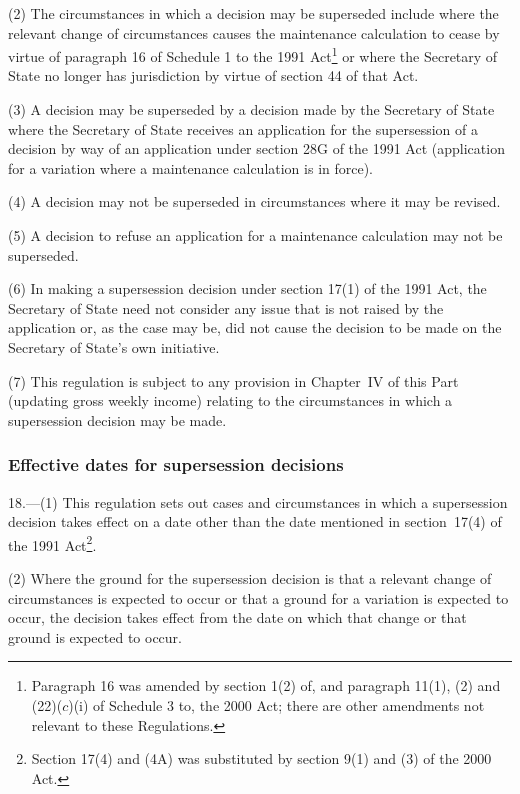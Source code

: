 \documentclass[12pt,a4paper]{article}
\begin{document}
(2) The circumstances in which a decision may be superseded include where the relevant change of circumstances causes the maintenance calculation to cease by virtue of paragraph 16 of Schedule 1 to the 1991 Act\footnote{Paragraph 16 was amended by section 1(2) of, and paragraph 11(1), (2) and (22)($c$)(i)  of Schedule 3 to, the 2000 Act; there are other amendments not relevant to these Regulations.} or where the Secretary of State no longer has jurisdiction by virtue of section 44 of that Act.

(3) A decision may be superseded by a decision made by the Secretary of State where the Secretary of State receives an application for the supersession of a decision by way of an application under section 28G of the 1991 Act (application for a variation where a maintenance calculation is in force).

(4) A decision may not be superseded in circumstances where it may be revised.

(5) A decision to refuse an application for a maintenance calculation may not be superseded.

(6) In making a supersession decision under section 17(1) of the 1991 Act, the Secretary of State need not consider any issue that is not raised by the application or, as the case may be, did not cause the decision to be made on the Secretary of State’s own initiative.

(7) This regulation is subject to any provision in Chapter~IV of this Part (updating gross weekly income) relating to the circumstances in which a supersession decision may be made.

\subsubsection[18. Effective dates for supersession decisions]{Effective dates for supersession decisions}

18.---(1)  This regulation sets out cases and circumstances in which a supersession decision takes effect on a date other than the date mentioned in section~17(4) of the 1991 Act\footnote{Section 17(4) and (4A) was substituted by section 9(1) and (3) of the 2000 Act.}.

(2) Where the ground for the supersession decision is that a relevant change of circumstances is expected to occur or that a ground for a variation is expected to occur, the decision takes effect from the date on which that change or that ground is expected to occur.
\end{document}
